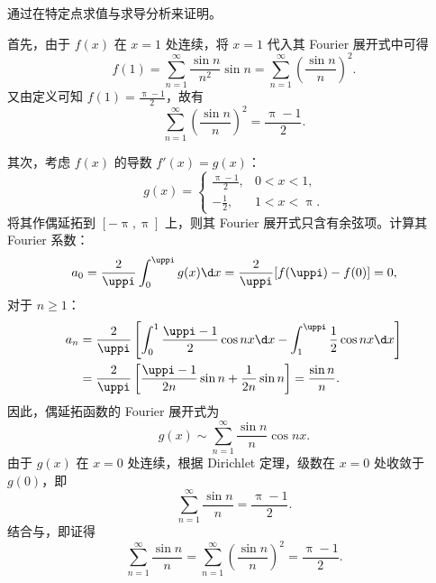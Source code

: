 \begin{myproof}
    通过在特定点求值与求导分析来证明。

    首先，由于 $f(x)$ 在 $x=1$ 处连续，将 $x=1$ 代入其 Fourier 展开式中可得
    \begin{equation}\label{eq:f1-value}
        f(1) = \sum_{n=1}^{\infty} \frac{\sin n}{n^2} \sin n = \sum_{n=1}^{\infty} \left( \frac{\sin n}{n} \right)^2.
    \end{equation}
    又由定义可知 $f(1) = \frac{\uppi-1}{2}$，故有
    \begin{equation}\label{eq:part1-1}
        \sum_{n=1}^{\infty} \left( \frac{\sin n}{n} \right)^2 = \frac{\uppi-1}{2}.
    \end{equation}

    其次，考虑 $f(x)$ 的导数 $f'(x) = g(x)$：
    \begin{equation}\label{eq:g-def}
        g(x) = \begin{cases} \frac{\uppi-1}{2}, & 0 < x < 1, \\ -\frac{1}{2}, & 1 < x < \uppi. \end{cases}
    \end{equation}
    将其作偶延拓到 $[-\uppi, \uppi]$ 上，则其 Fourier 展开式只含有余弦项。计算其 Fourier 系数：
    \begin{equation}\label{eq:g-a0}
        a_0 = \frac{2}{\uppi} \int_{0}^{\uppi} g(x) \d x = \frac{2}{\uppi} [f(\uppi) - f(0)] = 0,
    \end{equation}
    对于 $n \geqslant 1$：
    \begin{equation}\label{eq:g-an}
        \begin{aligned}
            a_n & = \frac{2}{\uppi} \left[ \int_{0}^{1} \frac{\uppi-1}{2} \cos nx \d x - \int_{1}^{\uppi} \frac{1}{2} \cos nx \d x \right] \\
                & = \frac{2}{\uppi} \left[ \frac{\uppi-1}{2n} \sin n + \frac{1}{2n} \sin n \right] = \frac{\sin n}{n}.
        \end{aligned}
    \end{equation}
    因此，偶延拓函数的 Fourier 展开式为
    \begin{equation}\label{eq:g-fourier}
        g(x) \sim \sum_{n=1}^{\infty} \frac{\sin n}{n} \cos nx.
    \end{equation}
    由于 $g(x)$ 在 $x=0$ 处连续，根据 Dirichlet 定理，级数在 $x=0$ 处收敛于 $g(0)$，即
    \begin{equation}\label{eq:g0-value}
        \sum_{n=1}^{\infty} \frac{\sin n}{n} = \frac{\uppi-1}{2}.
    \end{equation}
    结合与，即证得
    \begin{equation}
        \sum_{n=1}^{\infty} \frac{\sin n}{n} = \sum_{n=1}^{\infty} \left(\frac{\sin n}{n}\right)^2 = \frac{\uppi-1}{2}.
    \end{equation}


\end{myproof}
